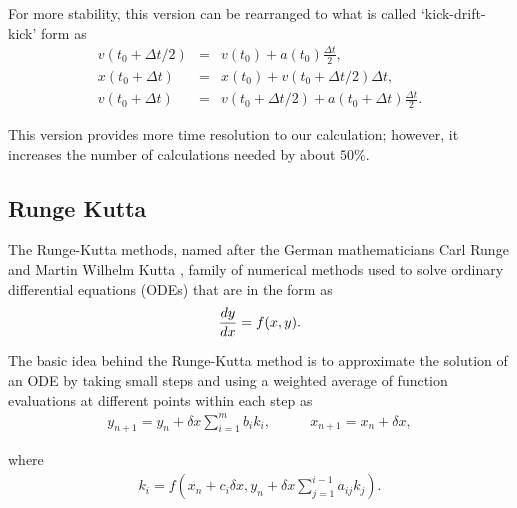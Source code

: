 \documentclass[a4paper,oneside,12pt]{report}
\numberwithin{equation}{chapter}
\begin{document}
\vspace{-40pt}
\noindent
For more stability, this version can be rearranged to what is called `kick-drift-kick' form as
\vspace{-20pt}
\begin{eqnarray} \label{eq:leapfrog}
    v(t_0 + \Delta t/2) &=& v(t_0) +  a(t_0)\frac{\Delta t}{2}   ,  \\
    x(t_0 + \Delta t) &=& x(t_0) + v(t_0 + \Delta t/2)\Delta t   , \\
    v(t_0 + \Delta t) &=& v(t_0 + \Delta t/2) + a(t_0 + \Delta t)\frac{\Delta t}{2} . 
\end{eqnarray}

\vspace{-40pt}
\noindent
This version provides more time resolution to our calculation; however, it increases the number of calculations needed by about $50\%$.

\subsection{Runge Kutta} \label{sec:rungekutta}

The Runge-Kutta methods, named after the German mathematicians Carl Runge and Martin Wilhelm Kutta \cite{runge} \cite{kutta}, 
family of numerical methods
used to solve ordinary differential equations (ODEs) that are in the form as
\vspace{-15pt}\begin{equation} \label{eq:first-order-ODE}
    \deriv{y}{x} = f(x, y) .
\vspace{-10pt}\end{equation}

\vspace{-20pt}
\noindent
The basic idea behind the Runge-Kutta method is to approximate the solution of an ODE by taking small steps and using a weighted average 
of function evaluations at different points within each step as
\vspace{-15pt}\begin{equation} \label{eq:general-rk}
    \begin{aligned}
        y_{n+1} = y_n + \delta x \sum_{i=1}^{m} b_i k_i  ,
    \end{aligned}
    \qquad
    \begin{aligned}
        x_{n+1} = x_n + \delta x   ,
    \end{aligned}
\end{equation}

\vspace{-35pt}
\noindent
where 
\vspace{-15pt}\begin{eqnarray} \label{eq:general-rk-coef}
    k_i = f(x_n + c_i \delta x, y_n + \delta x \sum_{j = 1}^{i - 1}a_{ij}k_j) .
\end{eqnarray}
\end{document}
